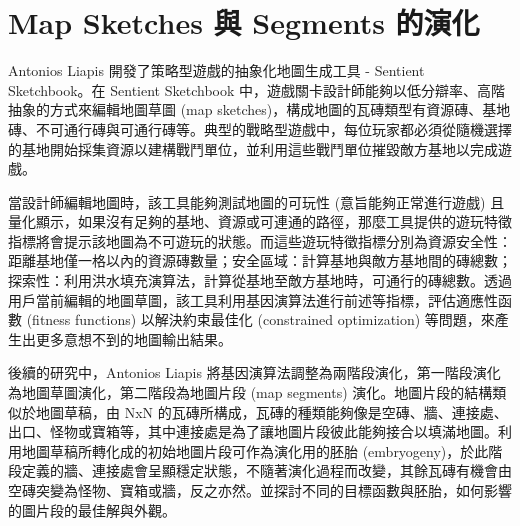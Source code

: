 \section{Map Sketches 與 Segments 的演化}

Antonios Liapis 開發了策略型遊戲的抽象化地圖生成工具 - Sentient Sketchbook。在 Sentient Sketchbook 中，遊戲關卡設計師能夠以低分辯率、高階抽象的方式來編輯地圖草圖 (map sketches)，構成地圖的瓦磚類型有資源磚、基地磚、不可通行磚與可通行磚等。典型的戰略型遊戲中，每位玩家都必須從隨機選擇的基地開始採集資源以建構戰鬥單位，並利用這些戰鬥單位摧毀敵方基地以完成遊戲。

當設計師編輯地圖時，該工具能夠測試地圖的可玩性 (意旨能夠正常進行遊戲) 且量化顯示，如果沒有足夠的基地、資源或可連通的路徑，那麼工具提供的遊玩特徵指標將會提示該地圖為不可遊玩的狀態。而這些遊玩特徵指標分別為資源安全性：距離基地僅一格以內的資源磚數量；安全區域：計算基地與敵方基地間的磚總數；探索性：利用洪水填充演算法，計算從基地至敵方基地時，可通行的磚總數。透過用戶當前編輯的地圖草圖，該工具利用基因演算法進行前述等指標，評估適應性函數 (fitness functions) 以解決約束最佳化 (constrained optimization) 等問題，來產生出更多意想不到的地圖輸出結果。

後續的研究中，Antonios Liapis 將基因演算法調整為兩階段演化，第一階段演化為地圖草圖演化，第二階段為地圖片段 (map segments) 演化。地圖片段的結構類似於地圖草稿，由 NxN 的瓦磚所構成，瓦磚的種類能夠像是空磚、牆、連接處、出口、怪物或寶箱等，其中連接處是為了讓地圖片段彼此能夠接合以填滿地圖。利用地圖草稿所轉化成的初始地圖片段可作為演化用的胚胎 (embryogeny)，於此階段定義的牆、連接處會呈顯穩定狀態，不隨著演化過程而改變，其餘瓦磚有機會由空磚突變為怪物、寶箱或牆，反之亦然。並探討不同的目標函數與胚胎，如何影響的圖片段的最佳解與外觀。
